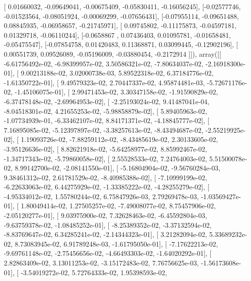 \documentclass{article}
\begin{document}
       [ 0.01660032, -0.09649041, -0.00675409, -0.05830411, -0.16056245],
       [-0.02577746, -0.01523564, -0.08051924, -0.00069299, -0.07656431],
       [-0.07955114, -0.09651488,  0.08845935, -0.06958657, -0.21745971],
       [ 0.09745802, -0.11175873, -0.04597181,  0.01329718, -0.06110244],
       [-0.0658867 ,  0.07436403,  0.01095781, -0.01658481, -0.05475547],
       [-0.07854758,  0.01420483,  0.11368871,  0.03099445, -0.12902196],
       [ 0.00551739,  0.09526089, -0.05196009, -0.03880454, -0.2172914 ]]), array([[ -6.61756492e-02,  -6.98399957e-02,   3.50586321e-02,
         -7.80634037e-02,  -2.16918300e-01],
       [  9.00213188e-02,   3.02000738e-03,   5.89522318e-02,
          6.37184776e-02,  -1.61350722e-01],
       [  9.49579323e-02,   2.70447337e-02,   4.95874481e-03,
         -5.72671176e-02,  -1.45106075e-01],
       [  2.99471453e-02,   3.30347158e-02,  -1.91590829e-02,
         -6.37478148e-02,  -2.69964953e-02],
       [ -2.25193024e-02,   9.41487041e-04,  -8.04518301e-02,
          4.21655253e-02,  -5.98858879e-02],
       [  5.89405963e-02,  -1.07734939e-01,  -6.33462107e-02,
          8.84171371e-02,  -4.18845777e-02],
       [  7.16895085e-02,  -5.12397897e-02,  -3.38257613e-02,
         -8.43494687e-02,  -2.55219925e-02],
       [  1.19093726e-02,  -7.88259112e-02,  -8.43485619e-02,
          2.30133605e-02,  -3.95126636e-02],
       [  8.82621918e-02,  -5.64258977e-02,   8.85992467e-02,
         -1.34717343e-02,  -5.79860058e-02],
       [  2.55528533e-02,   7.24764003e-02,   5.51500078e-02,
          8.99142700e-02,  -2.08141550e-01],
       [ -5.16804904e-02,  -9.56760284e-03,   9.38461312e-02,
          2.61781529e-02,  -8.40985388e-02],
       [ -7.10999199e-02,  -6.22633063e-02,   6.44275929e-02,
         -1.33385222e-02,  -4.28255279e-02],
       [ -4.95334012e-02,   1.55780244e-02,   6.75847926e-03,
          2.79269478e-03,  -1.03569427e-01],
       [  1.80049414e-02,   1.27505257e-02,  -7.49008077e-02,
          8.75457906e-02,  -2.05120277e-01],
       [  9.03975900e-02,   7.32628463e-02,  -6.45592804e-03,
         -9.63759378e-02,  -1.08485252e-01],
       [ -8.25389352e-02,  -3.37132594e-02,  -8.83769647e-02,
          6.34285241e-02,  -2.14344323e-01],
       [  3.21282094e-02,   5.33689232e-02,   8.73083945e-02,
          6.91789248e-03,  -1.61795050e-01],
       [ -7.17622213e-02,  -9.69761148e-02,  -2.75456656e-02,
         -4.66493303e-02,  -1.64020292e-01],
       [  2.82863409e-02,   3.13011253e-02,  -3.15172483e-02,
          7.76756625e-03,  -1.56173608e-01],
       [ -3.54019272e-02,   5.72764333e-02,   1.95398593e-02,
\end{document}
